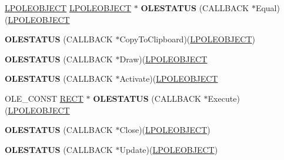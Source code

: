 \begin{DoxyCompactItemize}
\item 
\mbox{\label{struct___o_l_e_o_b_j_e_c_t_v_t_b_l_a7102219fbdbeca08916f834b9213f54e}} 
\hyperlink{struct___o_l_e_o_b_j_e_c_t}{L\+P\+O\+L\+E\+O\+B\+J\+E\+CT} \hyperlink{struct___o_l_e_o_b_j_e_c_t}{L\+P\+O\+L\+E\+O\+B\+J\+E\+CT} $\ast$ {\bfseries O\+L\+E\+S\+T\+A\+T\+US} (C\+A\+L\+L\+B\+A\+CK $\ast$Equal)(\hyperlink{struct___o_l_e_o_b_j_e_c_t}{L\+P\+O\+L\+E\+O\+B\+J\+E\+CT}
\item 
\mbox{\label{struct___o_l_e_o_b_j_e_c_t_v_t_b_l_a5e36ac44a8dac3c1a2105741e3598d7f}} 
{\bfseries O\+L\+E\+S\+T\+A\+T\+US} (C\+A\+L\+L\+B\+A\+CK $\ast$Copy\+To\+Clipboard)(\hyperlink{struct___o_l_e_o_b_j_e_c_t}{L\+P\+O\+L\+E\+O\+B\+J\+E\+CT})
\item 
\mbox{\label{struct___o_l_e_o_b_j_e_c_t_v_t_b_l_af3eb22b3b25ef32bcee2a92187bfec0a}} 
{\bfseries O\+L\+E\+S\+T\+A\+T\+US} (C\+A\+L\+L\+B\+A\+CK $\ast$Draw)(\hyperlink{struct___o_l_e_o_b_j_e_c_t}{L\+P\+O\+L\+E\+O\+B\+J\+E\+CT}
\item 
\mbox{\label{struct___o_l_e_o_b_j_e_c_t_v_t_b_l_a090b2a42a54d836cbdd31ef7212d41b1}} 
{\bfseries O\+L\+E\+S\+T\+A\+T\+US} (C\+A\+L\+L\+B\+A\+CK $\ast$Activate)(\hyperlink{struct___o_l_e_o_b_j_e_c_t}{L\+P\+O\+L\+E\+O\+B\+J\+E\+CT}
\item 
\mbox{\label{struct___o_l_e_o_b_j_e_c_t_v_t_b_l_a1bd85984f6b0b783bfab64ae1a9c73be}} 
O\+L\+E\+\_\+\+C\+O\+N\+ST \hyperlink{structtag_r_e_c_t}{R\+E\+CT} $\ast$ {\bfseries O\+L\+E\+S\+T\+A\+T\+US} (C\+A\+L\+L\+B\+A\+CK $\ast$Execute)(\hyperlink{struct___o_l_e_o_b_j_e_c_t}{L\+P\+O\+L\+E\+O\+B\+J\+E\+CT}
\item 
\mbox{\label{struct___o_l_e_o_b_j_e_c_t_v_t_b_l_abab40abb221e86ca6a17643d730446c0}} 
{\bfseries O\+L\+E\+S\+T\+A\+T\+US} (C\+A\+L\+L\+B\+A\+CK $\ast$Close)(\hyperlink{struct___o_l_e_o_b_j_e_c_t}{L\+P\+O\+L\+E\+O\+B\+J\+E\+CT})
\item 
\mbox{\label{struct___o_l_e_o_b_j_e_c_t_v_t_b_l_a8ecb231c4867b0ba4ddb620bb0559c3c}} 
{\bfseries O\+L\+E\+S\+T\+A\+T\+US} (C\+A\+L\+L\+B\+A\+CK $\ast$Update)(\hyperlink{struct___o_l_e_o_b_j_e_c_t}{L\+P\+O\+L\+E\+O\+B\+J\+E\+CT})

\end{DoxyCompactItemize}

